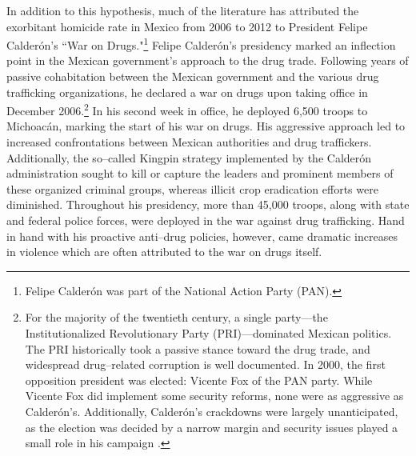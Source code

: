 \documentclass[12pt,letter,english,intoc,bibliography=totoc,index=totoc,BCOR10mm,captions=tableheading,nottitlepage,fleqn]{article}
\theoremstyle{break}
\begin{document}
In addition to this hypothesis, much of the literature has attributed the exorbitant homicide rate in Mexico from 2006 to 2012 to President Felipe Calder\'{o}n's ``War on Drugs."\footnote{Felipe Calder\'{o}n was part of the National Action Party (PAN).} Felipe Calder\'{o}n's presidency marked an inflection point in the Mexican government's approach to the drug trade. Following years of passive cohabitation between the Mexican government and the various drug trafficking organizations, he declared a war on drugs upon taking office in December 2006.\footnote{For the majority of the twentieth century, a single party---the Institutionalized Revolutionary Party (PRI)---dominated Mexican politics. The PRI historically took a passive stance toward the drug trade, and widespread drug--related corruption is well documented. In 2000, the first opposition president was elected: Vicente Fox of the PAN party. While Vicente Fox did implement some security reforms, none were as aggressive as Calder\'{o}n's. Additionally, Calder\'{o}n's crackdowns were largely unanticipated, as the election was decided by a narrow margin and security issues played a small role in his campaign \citep{dell2015}.} In his second week in office, he deployed 6,500 troops to Michoac\'{a}n, marking the start of his war on drugs. His aggressive approach led to increased confrontations between Mexican authorities and drug traffickers. Additionally, the so--called Kingpin strategy implemented by the Calder\'{o}n administration sought to kill or capture the leaders and prominent members of these organized criminal groups, whereas illicit crop eradication efforts were diminished. Throughout his presidency, more than 45,000 troops, along with state and federal police forces, were deployed in the war against drug trafficking. Hand in hand with his proactive anti--drug policies, however, came dramatic increases in violence which are often attributed to the war on drugs itself. 
\end{document}

